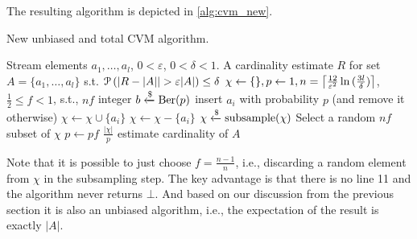 The resulting algorithm is depicted in \cref{alg:cvm_new}.
\begin{algorithm}[t]
	\caption{New unbiased and total CVM algorithm.}\label{alg:cvm_new}
	\begin{algorithmic}[1]
  \Require Stream elements $a_1,\dots,a_l$, $0 < \varepsilon$, $0 < \delta < 1$.
  \Ensure A cardinality estimate $R$ for set $A = \{ a_1,\dots,a_l \}$ s.t. $\prob \left( |R - |A| | > \varepsilon |A| \right) \leq \delta$
  \State $\chi \gets \{\}, p \gets 1, n = \ceil*{\frac{12}{\varepsilon^2} \ln{(\frac{3l}{\delta})} }$, $\frac{1}{2} \leq f < 1$, s.t., $nf$ integer
    \State $b \getsr \Ber(p)$ \Comment insert $a_i$ with probability $p$ (and remove it otherwise)
      \State $\chi \gets \chi \cup \{a_i\}$
    \Else
      \State $\chi \gets \chi - \{a_i\}$
    \EndIf
      \State $\chi \getsr \mathrm{subsample}(\chi)$ \Comment Select a random $nf$ subset of $\chi$
      \State $p \gets pf$
    \EndIf
  \EndFor
  \State \Return $\frac{|\chi|}{p}$ \Comment estimate cardinality of $A$
  \end{algorithmic}
\end{algorithm}%
Note that it is possible to just choose $f = \frac{n-1}{n}$, i.e., discarding a random element from $\chi$ in the subsampling step.
The key advantage is that there is no line 11 and the algorithm never returns $\bot$.
And based on our discussion from the previous section it is also an unbiased algorithm, i.e., the expectation of the result is exactly $|A|$.

